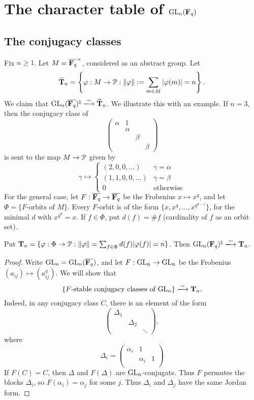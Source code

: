 \documentclass{article}
\begin{document}
\section{The character table of \texorpdfstring{$\operatorname{GL}_n(\mathbf{F}_q)$}{GLnFq}}


\subsection{The conjugacy classes}

Fix $n\geqslant 1$. Let $M=\overline{\mathbf{F}_q}^\times$, considered as an abstract 
group. Let 
\[
  \widetilde{\mathbf{T}}_n = \left\{\varphi:M\to \mathcal{P}:\|\varphi\| := \sum_{m\in M} |\varphi(m)| = n\right\} . 
\]
We claim that $\generallinear_n(\overline{\dF_q})^\natural \isomorphism \widetilde\dT_n$. 
We illustrate this with an example. If $n=3$, then the conjugacy class of 
\[
  \begin{pmatrix} \alpha & 1 \\ & \alpha \\ & & \beta \\ & & & \beta \end{pmatrix}
\]
is sent to the map $M\to \mathcal{P}$ given by 
\[
  \gamma\mapsto 
  \begin{cases}
    (2,0,0,\dots) & \gamma = \alpha \\ 
    (1,1,0,0,\dots) & \gamma = \beta \\
    0 & \text{otherwise} 
  \end{cases}
\]
For the general case, let $F:\overline{\mathbf{F}_q} \to \overline{\mathbf{F}_q}$ be the Frobenius 
$x\mapsto x^q$, and let $\Phi=\{\text{$F$-orbits of $M$}\}$. Every $F$-orbit is 
of the form $\{x,x^q,\dots,x^{q^{d-1}}\}$, for the minimal $d$ with 
$x^{q^d} = x$. If $f\in \Phi$, put 
$d(f) = \# f$ (cardinality of $f$ as an orbit set). 

\begin{proposition}
Put $\mathbf{T}_n = \{\varphi:\Phi\to \mathcal{P}:\|\varphi\| = \sum_{f\in \Phi} d(f)|\varphi(f)| = n\}$. 
Then $\generallinear_n(\dF_q)^\natural \isomorphism \dT_n$. 
\end{proposition}
\begin{proof}
Write $\operatorname{GL}_n = \operatorname{GL}_n(\overline{\mathbf{F}_q})$, and 
let $F:\operatorname{GL}_n\to \operatorname{GL}_n$ be the Frobenius 
$(a_{i j})\mapsto (a_{i j}^q)$. We will show that 
\[
  \{\text{$F$-stable conjugacy classes of $\generallinear_n$}\}\isomorphism \dT_n .
\]
Indeed, in any conjugacy class $C$, there is an element of the form 
\[
  \begin{pmatrix} \Delta_1 \\ & \Delta_2 \\ & & \ddots \end{pmatrix} ,
\]
where 
\[
  \Delta_i = \begin{pmatrix} \alpha_i & 1 \\ & \alpha_i & 1 \\ \end{pmatrix}
\]
If $F(C)=C$, then $\Delta$ and $F(\Delta)$ are $\operatorname{GL}_n$-conjugate. Thus 
$F$ permutes the blocks $\Delta_i$, so $F(\alpha_i) = \alpha_j$ for some $j$. Thus 
$\Delta_i$ and $\Delta_j$ have the same Jordan form. 
\end{proof}
\end{document}
